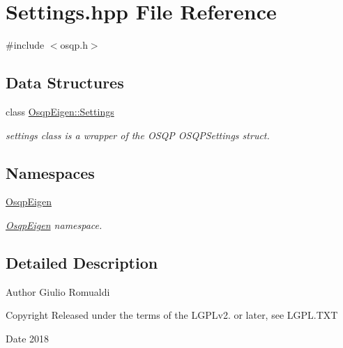 \section{Settings.\+hpp File Reference}
\label{Settings_8hpp}
{\ttfamily \#include $<$osqp.\+h$>$}\newline
\subsection*{Data Structures}
\begin{DoxyCompactItemize}
\item 
class \mbox{\hyperlink{classOsqpEigen_1_1Settings}{Osqp\+Eigen\+::\+Settings}}
\begin{DoxyCompactList}\small\item\em settings class is a wrapper of the O\+S\+QP O\+S\+Q\+P\+Settings struct. \end{DoxyCompactList}\end{DoxyCompactItemize}
\subsection*{Namespaces}
\begin{DoxyCompactItemize}
\item 
 \mbox{\hyperlink{namespaceOsqpEigen}{Osqp\+Eigen}}
\begin{DoxyCompactList}\small\item\em \mbox{\hyperlink{namespaceOsqpEigen}{Osqp\+Eigen}} namespace. \end{DoxyCompactList}\end{DoxyCompactItemize}


\subsection{Detailed Description}
\begin{DoxyAuthor}{Author}
Giulio Romualdi 
\end{DoxyAuthor}
\begin{DoxyCopyright}{Copyright}
Released under the terms of the L\+G\+P\+Lv2. or later, see L\+G\+P\+L.\+T\+XT 
\end{DoxyCopyright}
\begin{DoxyDate}{Date}
2018 
\end{DoxyDate}
